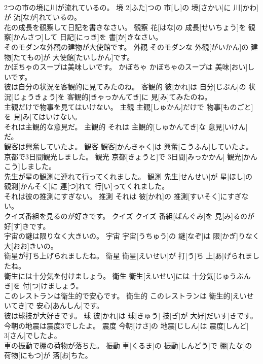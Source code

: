 \documentclass[8pt]{extreport}
\begin{document}
\begin{CJK}{UTF8}{min}
\\	2つの市の境に川が流れているの。	境	2[ふた]つの 市[し]の 境[さかい]に 川[かわ]が 流[なが]れているの。	
\\	花の成長を観察して日記を書きなさい。	観察	花[はな]の 成長[せいちょう]を 観察[かんさつ]して 日記[にっき]を 書[か]きなさい。	
\\	そのモダンな外観の建物が大使館です。	外観	そのモダンな 外観[がいかん]の 建物[たてもの]が 大使館[たいしかん]です。	
\\	かぼちゃのスープは美味しいです。	かぼちゃ	かぼちゃのスープは 美味[おい]しいです。	
\\	彼は自分の状況を客観的に見てみたのね。	客観的	彼[かれ]は 自分[じぶん]の 状況[じょうきょう]を 客観的[きゃっかんてき]に 見[み]てみたのね。	
\\	主観だけで物事を見てはいけない。	主観	主観[しゅかん]だけで 物事[ものごと]を 見[み]てはいけない。	
\\	それは主観的な意見だ。	主観的	それは 主観的[しゅかんてき]な 意見[いけん]だ。	
\\	観客は興奮していたよ。	観客	観客[かんきゃく]は 興奮[こうふん]していたよ。	
\\	京都で3日間観光しました。	観光	京都[きょうと]で 3日間[みっかかん] 観光[かんこう]しました。	
\\	先生が星の観測に連れて行ってくれました。	観測	先生[せんせい]が 星[ほし]の 観測[かんそく]に 連[つ]れて 行[い]ってくれました。	
\\	それは彼の推測にすぎない。	推測	それは 彼[かれ]の 推測[すいそく]にすぎない。	
\\	クイズ番組を見るのが好きです。	クイズ	クイズ 番組[ばんぐみ]を 見[み]るのが 好[す]きです。	
\\	宇宙の謎は限りなく大きいの。	宇宙	宇宙[うちゅう]の 謎[なぞ]は 限[かぎ]りなく 大[おお]きいの。	
\\	衛星が打ち上げられましたね。	衛星	衛星[えいせい]が 打[う]ち 上[あ]げられましたね。	
\\	衛生には十分気を付けましょう。	衛生	衛生[えいせい]には 十分気[じゅうぶん き]を 付[つ]けましょう。	
\\	このレストランは衛生的で安心です。	衛生的	このレストランは 衛生的[えいせいてき]で 安心[あんしん]です。	
\\	彼は球技が大好きです。	球	彼[かれ]は 球[きゅう] 技[ぎ]が 大好[だいす]きです。	
\\	今朝の地震は震度3でしたよ。	震度	今朝[けさ]の 地震[じしん]は 震度[しんど] 3[さん]でしたよ。	
\\	車の振動で棚の荷物が落ちた。	振動	車[くるま]の 振動[しんどう]で 棚[たな]の 荷物[にもつ]が 落[お]ちた。	

\end{CJK}
\end{document}
